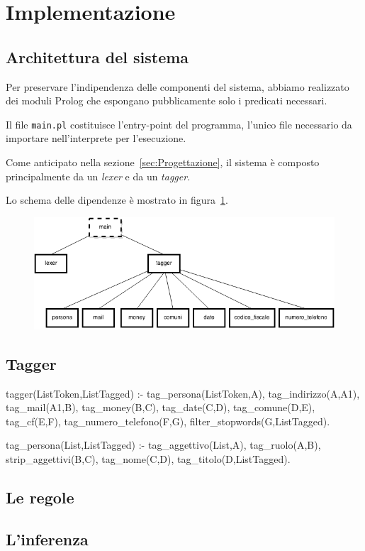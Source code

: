 \section{Implementazione}

\subsection{Architettura del sistema}
Per preservare l'indipendenza delle componenti del sistema, abbiamo realizzato dei moduli Prolog che espongano pubblicamente solo i predicati necessari.

Il file \verb+main.pl+ costituisce l'entry-point del programma, l'unico file necessario da importare nell'interprete per l'esecuzione.

Come anticipato nella sezione~\ref{sec:Progettazione}, il sistema è composto principalmente da un \emph{lexer} e da un \emph{tagger}.








Lo schema delle dipendenze è mostrato in figura~\ref{fig:moduli}.

\begin{figure}[h!tbp]
\includegraphics[width=\textwidth]{img/struttura_moduli.png}
\label{fig:moduli}
\end{figure}



\subsection{Tagger}
\begin{prologcode}
tagger(ListToken,ListTagged) :-
    tag_persona(ListToken,A),
    tag_indirizzo(A,A1),
    tag_mail(A1,B),
    tag_money(B,C),
    tag_date(C,D),
    tag_comune(D,E),
    tag_cf(E,F),
    tag_numero_telefono(F,G),
    filter_stopwords(G,ListTagged).
\end{prologcode}

\begin{prologcode}
tag_persona(List,ListTagged) :-
	tag_aggettivo(List,A),
	tag_ruolo(A,B),
	strip_aggettivi(B,C),
	tag_nome(C,D),
	tag_titolo(D,ListTagged).
\end{prologcode}


\subsection{Le regole}
\subsection{L'inferenza}